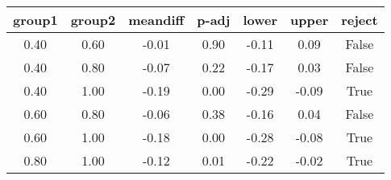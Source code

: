 \begin{tabular}{|c|c|c|c|c|c|c|}
\toprule
 group1 &  group2 &  meandiff &  p-adj &  lower &  upper &  reject \\
\midrule
   0.40 &    0.60 &     -0.01 &   0.90 &  -0.11 &   0.09 &   False \\
   0.40 &    0.80 &     -0.07 &   0.22 &  -0.17 &   0.03 &   False \\
   0.40 &    1.00 &     -0.19 &   0.00 &  -0.29 &  -0.09 &    True \\
   0.60 &    0.80 &     -0.06 &   0.38 &  -0.16 &   0.04 &   False \\
   0.60 &    1.00 &     -0.18 &   0.00 &  -0.28 &  -0.08 &    True \\
   0.80 &    1.00 &     -0.12 &   0.01 &  -0.22 &  -0.02 &    True \\
\bottomrule
\end{tabular}
